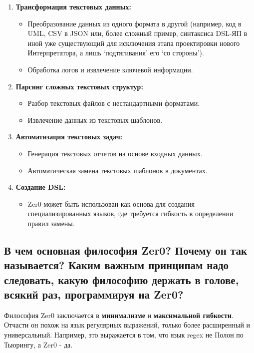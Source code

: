 \documentclass{book}
\begin{document}
\begin{enumerate}

\item \textbf{Трансформация текстовых данных:}
\begin{itemize}
\item Преобразование данных из одного формата в другой (например, код в UML, CSV в JSON или, более сложный пример, синтаксиса DSL-ЯП в иной уже существующий для исключения этапа проектировки нового Интерпретатора, а лишь `подтягивания' его `со стороны').
\item Обработка логов и извлечение ключевой информации.
\end{itemize}

\item \textbf{Парсинг сложных текстовых структур:}
\begin{itemize}
\item Разбор текстовых файлов с нестандартными форматами.
\item Извлечение данных из текстовых шаблонов.
\end{itemize}

\item \textbf{Автоматизация текстовых задач:}
\begin{itemize}
\item Генерация текстовых отчетов на основе входных данных.
\item Автоматическая замена текстовых шаблонов в документах.
\end{itemize}

\item \textbf{Создание DSL:}
\begin{itemize}
\item Zer0 может быть использован как основа для создания специализированных языков, где требуется гибкость в определении правил замены.
\end{itemize}

\end{enumerate}

\subsection{В чем основная философия Zer0? Почему он так называется? Каким важным принципам надо следовать, какую философию держать в голове, всякий раз, программируя на Zer0?}

Философия Zer0 заключается в \textbf{минимализме} и \textbf{максимальной гибкости}. Отчасти он похож на язык регулярных выражений, только более расширенный и универсальный. Например, это выражается в том, что язык regex не Полон по Тьюрингу, а Zer0 - да.
\end{document}
